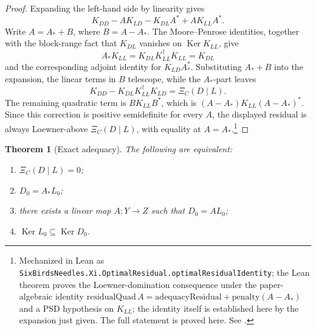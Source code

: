 \documentclass[11pt]{article}
\DeclareMathOperator{\Ker}{Ker}
\newtheorem{theorem}{Theorem}[section]
\theoremstyle{definition}
\begin{document}
\begin{proof}
Expanding the left-hand side by linearity gives
\[
  K_{DD}-AK_{LD}-K_{DL}A^*+AK_{LL}A^*.
\]
Write \(A=A_*+B\), where \(B=A-A_*\).  The Moore--Penrose identities, together
with the block-range fact that \(K_{DL}\) vanishes on \(\Ker K_{LL}\), give
\[
  A_*K_{LL}
  =
  K_{DL}K_{LL}^\dagger K_{LL}
  =
  K_{DL}
\]
and the corresponding adjoint identity for \(K_{LD}A_*^*\).  Substituting
\(A_*+B\) into the expansion, the linear terms in \(B\) telescope, while the
\(A_*\)-part leaves
\[
  K_{DD}-K_{DL}K_{LL}^\dagger K_{LD}
  =
  \Xi_C(D\mid L).
\]
The remaining quadratic term is \(BK_{LL}B^*\), which is
\((A-A_*)K_{LL}(A-A_*)^*\).  Since this correction is positive semidefinite for
every \(A\), the displayed residual is always Loewner-above
\(\Xi_C(D\mid L)\), with equality at \(A=A_*\).\footnote{Mechanized in Lean as \texttt{SixBirdsNeedles.Xi.OptimalResidual.optimalResidualIdentity}; the Lean theorem proves the Loewner-domination consequence under the paper-algebraic identity \(\mathrm{residualQuad}\,A=\mathrm{adequacyResidual}+\mathrm{penalty}(A-A_*)\) and a PSD hypothesis on \(K_{LL}\); the identity itself is established here by the expansion just given.  The full statement is proved here.  See .}
\end{proof}

\begin{theorem}[Exact adequacy]\label{thm:xi:exact-adequacy}
The following are equivalent:
\begin{enumerate}[label=(\roman*)]
  \item \(\Xi_C(D\mid L)=0\);
  \item \(D_0=A_*L_0\);
  \item there exists a linear map \(A\colon Y\to Z\) such that \(D_0=AL_0\);
  \item \(\Ker L_0\subseteq \Ker D_0\).
\end{enumerate}
\end{theorem}
\end{document}
